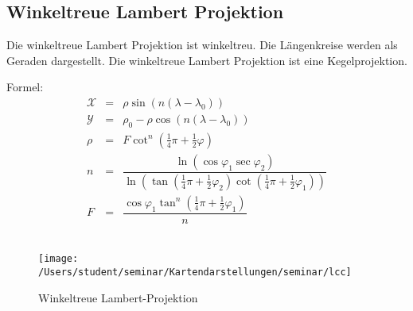 \subsection{ Winkeltreue Lambert Projektion}
\label{sec:lamwink}
Die winkeltreue Lambert Projektion ist winkeltreu. Die Längenkreise werden als Geraden dargestellt.
Die winkeltreue Lambert Projektion ist eine Kegelprojektion. 

Formel:\\
 \begin{eqnarray*}
 \mathcal{X}& = &\rho \sin ( n(\lambda -\lambda _0) )\\
 \mathcal{Y}& = &\rho _0-\rho \cos (n(\lambda - \lambda _0))\\
 \rho & = &F\cot ^n(\frac{1}{4}\pi + \frac{1}{2}\varphi)\\
 n& = &\dfrac{\ln (\cos \varphi _1 \sec \varphi _2)}{\ln (\tan (\frac{1}{4}\pi +\frac{1}{2}\varphi _2)\cot (\frac{1}{4}\pi + \frac{1}{2}\varphi _1))}\\
 F& = &\dfrac{\cos \varphi _1 \tan ^n(\frac{1}{4}\pi +\frac{1}{2}\varphi _1)}{n}
 \end{eqnarray*}\\
 
\begin{figure}[hbtp]
\centering
 \texttt{[image: /Users/student/seminar/Kartendarstellungen/seminar/lcc]} \caption{Winkeltreue Lambert-Projektion}
\end{figure}
\newpage 